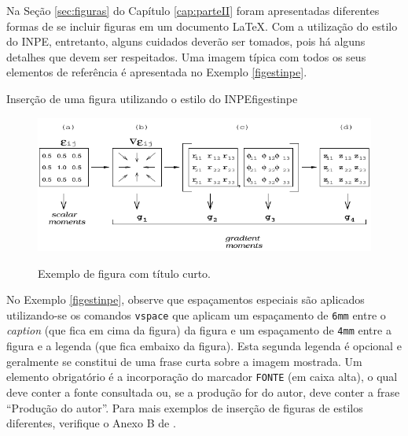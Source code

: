 Na Seção \ref{sec:figuras} do Capítulo \ref{cap:parteII} foram apresentadas diferentes formas de se incluir figuras em um documento \LaTeX{}. Com a utilização do estilo do INPE, entretanto, alguns cuidados deverão ser tomados, pois há alguns detalhes que devem ser respeitados. Uma imagem típica com todos os seus elementos de referência é apresentada no Exemplo \ref{figestinpe}.

\begin{texexptitled}[breakable,center lower,enhanced,middle=2mm,listing and text]{Inserção de uma figura utilizando o estilo do INPE}{figestinpe}
\begin{figure}[H]
  \caption{Exemplo de figura com título curto.}
  \vspace{6mm} %
  \begin{center}
    \includegraphics[width=12cm]{./docs/figs/gpa.pdf}  
  \end{center}
  \vspace{4mm} %
  \label{figgpa1}
\end{figure}
\end{texexptitled}

No Exemplo \ref{figestinpe}, observe que espaçamentos especiais são aplicados utilizando-se os comandos {\tt vspace} que aplicam um espaçamento de {\tt 6mm} entre o \textit{caption} (que fica em cima da figura) da figura e um espaçamento de {\tt 4mm} entre a figura e a legenda (que fica embaixo da figura). Esta segunda legenda é opcional e geralmente se constitui de uma frase curta sobre a imagem mostrada. Um elemento obrigatório é a incorporação do marcador {\tt FONTE} (em caixa alta), o qual deve conter a fonte consultada ou, se a produção for do autor, deve conter a frase ``Produção do autor''. Para mais exemplos de inserção de figuras de estilos diferentes, verifique o Anexo B de .

